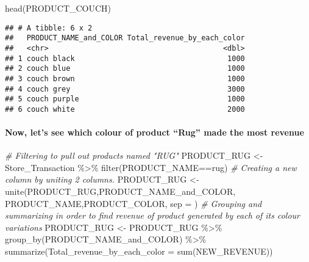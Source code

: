 \documentclass[
]{article}
\newenvironment{Shaded}{\begin{snugshade}}{\end{snugshade}}
\newcommand{\AttributeTok}[1]{\textcolor[rgb]{0.77,0.63,0.00}{#1}}
\newcommand{\CommentTok}[1]{\textcolor[rgb]{0.56,0.35,0.01}{\textit{#1}}}
\newcommand{\FunctionTok}[1]{\textcolor[rgb]{0.00,0.00,0.00}{#1}}
\newcommand{\NormalTok}[1]{#1}
\newcommand{\OtherTok}[1]{\textcolor[rgb]{0.56,0.35,0.01}{#1}}
\newcommand{\SpecialCharTok}[1]{\textcolor[rgb]{0.00,0.00,0.00}{#1}}
\newcommand{\StringTok}[1]{\textcolor[rgb]{0.31,0.60,0.02}{#1}}
\begin{document}
\begin{Shaded}
\begin{Highlighting}[]
\FunctionTok{head}\NormalTok{(PRODUCT\_COUCH)}
\end{Highlighting}
\end{Shaded}

\begin{verbatim}
## # A tibble: 6 x 2
##   PRODUCT_NAME_and_COLOR Total_revenue_by_each_color
##   <chr>                                        <dbl>
## 1 couch black                                   1000
## 2 couch blue                                    1000
## 3 couch brown                                   1000
## 4 couch grey                                    3000
## 5 couch purple                                  1000
## 6 couch white                                   2000
\end{verbatim}

\hypertarget{now-lets-see-which-colour-of-product-rug-made-the-most-revenue}{%
\paragraph{Now, let's see which colour of product ``Rug'' made the most
revenue}\label{now-lets-see-which-colour-of-product-rug-made-the-most-revenue}}

\begin{Shaded}
\begin{Highlighting}[]
\CommentTok{\# Filtering to pull out products named "RUG"}
\NormalTok{PRODUCT\_RUG }\OtherTok{\textless{}{-}}\NormalTok{ Store\_Transaction }\SpecialCharTok{\%\textgreater{}\%} \FunctionTok{filter}\NormalTok{(PRODUCT\_NAME}\SpecialCharTok{==}\StringTok{\textquotesingle{}rug\textquotesingle{}}\NormalTok{)}
\CommentTok{\# Creating a new column by uniting 2 columns.}
\NormalTok{PRODUCT\_RUG }\OtherTok{\textless{}{-}} \FunctionTok{unite}\NormalTok{(PRODUCT\_RUG,}\StringTok{\textquotesingle{}PRODUCT\_NAME\_and\_COLOR\textquotesingle{}}\NormalTok{, PRODUCT\_NAME,PRODUCT\_COLOR, }\AttributeTok{sep =} \StringTok{\textquotesingle{} \textquotesingle{}}\NormalTok{)}
\CommentTok{\# Grouping and summarizing in order to find revenue of product generated by each of its colour variations}
\NormalTok{PRODUCT\_RUG }\OtherTok{\textless{}{-}}\NormalTok{ PRODUCT\_RUG }\SpecialCharTok{\%\textgreater{}\%} \FunctionTok{group\_by}\NormalTok{(PRODUCT\_NAME\_and\_COLOR) }\SpecialCharTok{\%\textgreater{}\%}
  \FunctionTok{summarize}\NormalTok{(}\AttributeTok{Total\_revenue\_by\_each\_color =} \FunctionTok{sum}\NormalTok{(NEW\_REVENUE))}
\end{Highlighting}
\end{Shaded}
\end{document}
